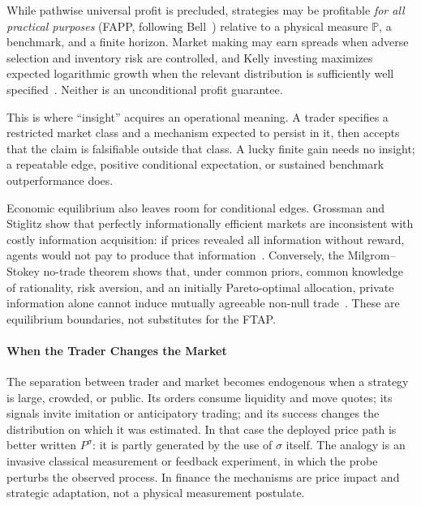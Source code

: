 \documentclass[aps,pra,reprint,superscriptaddress,amsmath,amssymb,floatfix]{revtex4-2}
\theoremstyle{plain}
\theoremstyle{definition}
\theoremstyle{remark}
\begin{document}
While pathwise universal profit is precluded, strategies may be profitable
\emph{for all practical purposes} (FAPP, following Bell~\cite{bell-a})
relative to a physical measure \(\mathbb{P}\), a benchmark, and a finite
horizon. Market making may earn spreads when adverse selection and inventory
risk are controlled, and Kelly investing maximizes expected logarithmic
growth when the relevant distribution is sufficiently well
specified~\cite{Kelly1956}. Neither is an unconditional profit guarantee.

This is where ``insight'' acquires an operational meaning. A trader specifies
a restricted market class and a mechanism expected to persist in it, then
accepts that the claim is falsifiable outside that class. A lucky finite gain
needs no insight; a repeatable edge, positive conditional expectation, or
sustained benchmark outperformance does.

Economic equilibrium also leaves room for conditional edges. Grossman and
Stiglitz show that perfectly informationally efficient markets are
inconsistent with costly information acquisition: if prices revealed all
information without reward, agents would not pay to produce that
information~\cite{GrossmanStiglitz1980}. Conversely, the Milgrom--Stokey
no-trade theorem shows that, under common priors, common knowledge of
rationality, risk aversion, and an initially Pareto-optimal allocation, private
information alone cannot induce mutually agreeable non-null
trade~\cite{MilgromStokey1982}. These are equilibrium boundaries, not
substitutes for the FTAP.

\paragraph{When the Trader Changes the Market}

The separation between trader and market becomes endogenous when a strategy is
large, crowded, or public. Its orders consume liquidity and move quotes; its
signals invite imitation or anticipatory trading; and its success changes the
distribution on which it was estimated. In that case the deployed price path
is better written \(P^\sigma\): it is partly generated by the use of
\(\sigma\) itself. The analogy is an invasive classical measurement or
feedback experiment, in which the probe perturbs the observed process. In
finance the mechanisms are price impact and strategic adaptation, not a
physical measurement postulate.
\end{document}
